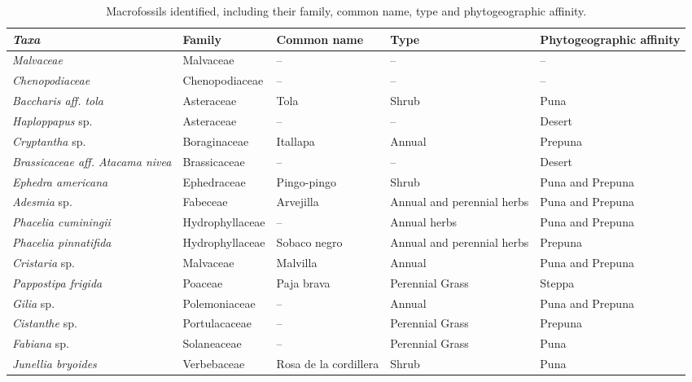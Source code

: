 \documentclass{article}
\begin{document}
\begin{sidewaystable}[ht]
\centering
\caption{Macrofossils identified, including their family, common name, type and phytogeographic affinity.}
\begin{adjustbox}{max width=\textwidth}
\begin{large}
\begin{tabular}{@{}lllll@{}}
\toprule
\textbf{\textit{Taxa}} & \textbf{Family} & \textbf{Common name} & \textbf{Type} & \textbf{Phytogeographic affinity} \\ \midrule\midrule
\textit{Malvaceae} & Malvaceae & -- & -- & -- \\
\textit{Chenopodiaceae} & Chenopodiaceae & -- & -- & -- \\
\textit{Baccharis aff. tola} & Asteraceae & Tola & Shrub & Puna \\
\textit{Haploppapus} sp. & Asteraceae & -- & -- & Desert \\
\textit{Cryptantha} sp. & Boraginaceae & Itallapa & Annual & Prepuna \\
\textit{Brassicaceae aff. Atacama nivea} & Brassicaceae & -- & -- & Desert \\
\textit{Ephedra americana} & Ephedraceae & Pingo-pingo & Shrub & Puna and Prepuna \\
\textit{Adesmia} sp. & Fabeceae & Arvejilla & Annual and perennial herbs & Puna and Prepuna \\
\textit{Phacelia cuminingii} & Hydrophyllaceae & -- & Annual herbs & Puna and Prepuna \\
\textit{Phacelia pinnatifida} & Hydrophyllaceae & Sobaco negro & Annual and perennial herbs & Prepuna \\
\textit{Cristaria} sp. & Malvaceae & Malvilla & Annual & Puna and Prepuna \\
\textit{Pappostipa frigida} & Poaceae & Paja brava & Perennial Grass & Steppa \\
\textit{Gilia} sp. & Polemoniaceae & -- & Annual & Puna and Prepuna \\
\textit{Cistanthe} sp. & Portulacaceae & -- & Perennial Grass & Prepuna \\
\textit{Fabiana} sp. & Solaneaceae & -- & Perennial Grass & Puna \\
\textit{Junellia bryoides} & Verbebaceae & Rosa de la cordillera & Shrub & Puna \\ \bottomrule
\end{tabular}
\end{large}
\end{adjustbox}
\end{sidewaystable}
\end{document}

